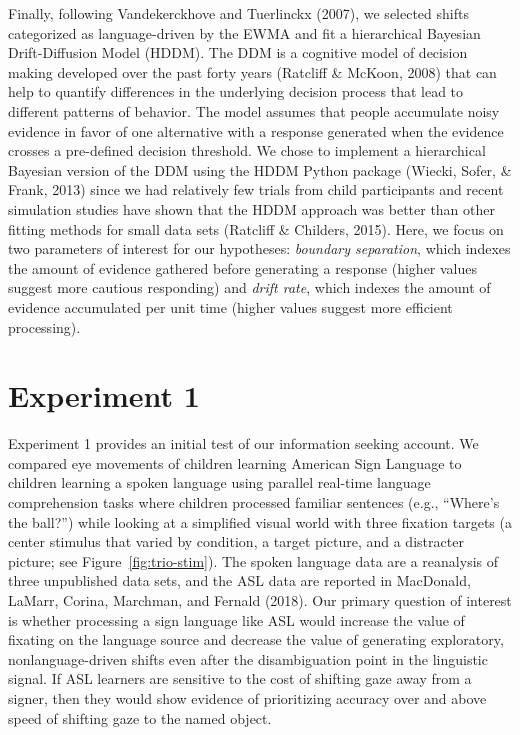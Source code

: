 \documentclass[english,floatsintext,man]{apa6}
\begin{document}
Finally, following Vandekerckhove and Tuerlinckx (2007), we selected
shifts categorized as language-driven by the EWMA and fit a hierarchical
Bayesian Drift-Diffusion Model (HDDM). The DDM is a cognitive model of
decision making developed over the past forty years (Ratcliff \& McKoon,
2008) that can help to quantify differences in the underlying decision
process that lead to different patterns of behavior. The model assumes
that people accumulate noisy evidence in favor of one alternative with a
response generated when the evidence crosses a pre-defined decision
threshold. We chose to implement a hierarchical Bayesian version of the
DDM using the HDDM Python package (Wiecki, Sofer, \& Frank, 2013) since
we had relatively few trials from child participants and recent
simulation studies have shown that the HDDM approach was better than
other fitting methods for small data sets (Ratcliff \& Childers, 2015).
Here, we focus on two parameters of interest for our hypotheses:
\emph{boundary separation}, which indexes the amount of evidence
gathered before generating a response (higher values suggest more
cautious responding) and \emph{drift rate}, which indexes the amount of
evidence accumulated per unit time (higher values suggest more efficient
processing).

\hypertarget{experiment-1}{%
\section{Experiment 1}\label{experiment-1}}

Experiment 1 provides an initial test of our information seeking
account. We compared eye movements of children learning American Sign
Language to children learning a spoken language using parallel real-time
language comprehension tasks where children processed familiar sentences
(e.g., \enquote{Where's the ball?}) while looking at a simplified visual
world with three fixation targets (a center stimulus that varied by
condition, a target picture, and a distracter picture; see
Figure~\ref{fig:trio-stim}). The spoken language data are a reanalysis
of three unpublished data sets, and the ASL data are reported in
MacDonald, LaMarr, Corina, Marchman, and Fernald (2018). Our primary
question of interest is whether processing a sign language like ASL
would increase the value of fixating on the language source and decrease
the value of generating exploratory, nonlanguage-driven shifts even
after the disambiguation point in the linguistic signal. If ASL learners
are sensitive to the cost of shifting gaze away from a signer, then they
would show evidence of prioritizing accuracy over and above speed of
shifting gaze to the named object.
\end{document}
